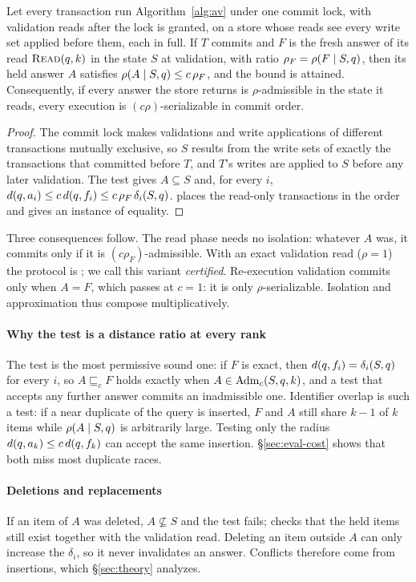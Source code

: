\documentclass[sigconf, nonacm, review]{acmart}
\begin{document}
\begin{theorem}[Safety]
\label{thm:safety}
Let every transaction run Algorithm~\ref{alg:av} under one commit lock,
with validation reads after the lock is granted, on a store whose
reads see every write set applied before them, each in full. If $T$ commits
and $F$ is the fresh answer of its read $\textsc{Read}(q,k)$ in the state
$S$ at validation, with ratio $\rho_F=\rho(F\mid S,q)$, then its held
answer $A$ satisfies $\rho(A\mid S,q)\le c\,\rho_F$, and the bound is
attained. Consequently, if every answer the store returns is
$\rho$-admissible in the state it reads, every execution is
$(c\rho)$-serializable in commit order.
\end{theorem}
\begin{proof}
The commit lock makes validations and write applications of different
transactions mutually exclusive, so $S$ results from the write sets of
exactly the transactions that committed before $T$, and $T$'s writes
are applied to $S$ before any later validation. The test gives
$A\subseteq S$ and, for every $i$,
$d(q,a_i)\le c\,d(q,f_i)\le c\,\rho_F\,\delta_i(S,q)$.
\AppProofs{} places the read-only transactions in the order and gives
an instance of equality.
\end{proof}

Three consequences follow. The read phase needs no isolation: whatever
$A$ was, it commits only if it is $(c\rho_F)$-admissible. With an exact
validation read ($\rho=1$) the protocol is \cser{}; we call this
variant \emph{certified}. Re-execution validation commits only when
$A=F$, which passes at $c=1$: it is only $\rho$-serializable.
Isolation and approximation thus compose multiplicatively.

\paragraph{Why the test is a distance ratio at every rank}
The test is the most permissive sound one: if $F$ is exact, then
$d(q,f_i)=\delta_i(S,q)$ for every $i$, so $A\sqsubseteq_c F$ holds
exactly when $A\in\mathrm{Adm}_c(S,q,k)$, and a test that accepts any further
answer commits an inadmissible one. Identifier overlap is such a test: if a near duplicate of the query is inserted, $F$ and
$A$ still share $k-1$ of $k$ items while $\rho(A\mid S,q)$ is
arbitrarily large. Testing only the radius
$d(q,a_k)\le c\,d(q,f_k)$ can accept the same insertion.
\S\ref{sec:eval-cost} shows that both miss most duplicate races.

\paragraph{Deletions and replacements}
If an item of $A$ was deleted, $A\not\subseteq S$ and the test fails;
\sys{} checks that the held items still exist together with the
validation read. Deleting an item outside $A$ can only increase the
$\delta_i$, so it never invalidates an answer. Conflicts therefore come
from insertions, which \S\ref{sec:theory} analyzes.
\end{document}
